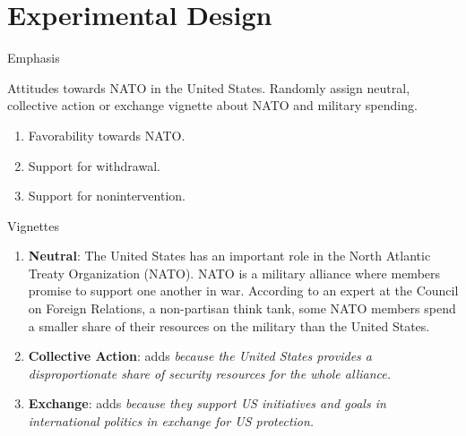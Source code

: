 \documentclass[12pt]{beamer}
\begin{document}

\section{Experimental Design} 


\begin{frame}{Emphasis}

Attitudes towards NATO in the United States. Randomly assign neutral, collective action or exchange vignette about NATO and military spending. 

\pause 
\begin{enumerate} 
\item Favorability towards NATO. 
\pause 
\item Support for withdrawal. 
\pause
\item Support for nonintervention. 
\end{enumerate}


\end{frame} 


\begin{frame}{Vignettes}


\begin{enumerate}

\item \textbf{Neutral}: The United States has an important role in the North Atlantic Treaty Organization (NATO). NATO is a military alliance where members promise to support one another in war. According to an expert at the Council on Foreign Relations, a non-partisan think tank, some NATO members spend a smaller share of their resources on the military than the United States. 
\pause
\item \textbf{Collective Action}: adds \textit{because the United States provides a disproportionate share of security resources for the whole alliance.} 
\pause
\item \textbf{Exchange}: adds \textit{because they support US initiatives and goals in international politics in exchange for US protection.}
 
\end{enumerate} 

\end{frame} 


\end{document}
